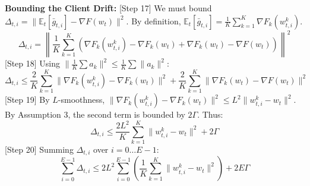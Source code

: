 \documentclass{article}
\begin{document}
\textbf{Bounding the Client Drift:}
[Step 17] We must bound $\Delta_{t,i} = \|\mathbb{E}_t[\bar{g}_{t,i}] - \nabla F(w_t)\|^2$. By definition, $\mathbb{E}_t[\bar{g}_{t,i}] = \frac{1}{K}\sum_{k=1}^K \nabla F_k(w_{t,i}^k)$.
$$ \Delta_{t,i} = \left\| \frac{1}{K}\sum_{k=1}^K \left( \nabla F_k(w_{t,i}^k) - \nabla F_k(w_t) + \nabla F_k(w_t) - \nabla F(w_t) \right) \right\|^2 $$
[Step 18] Using $\|\frac{1}{K}\sum a_k\|^2 \leq \frac{1}{K}\sum \|a_k\|^2$:
$$ \Delta_{t,i} \leq \frac{2}{K}\sum_{k=1}^K \|\nabla F_k(w_{t,i}^k) - \nabla F_k(w_t)\|^2 + \frac{2}{K}\sum_{k=1}^K \|\nabla F_k(w_t) - \nabla F(w_t)\|^2 $$
[Step 19] By $L$-smoothness, $\|\nabla F_k(w_{t,i}^k) - \nabla F_k(w_t)\|^2 \leq L^2 \|w_{t,i}^k - w_t\|^2$. By Assumption 3, the second term is bounded by $2\Gamma$. Thus:
$$ \Delta_{t,i} \leq \frac{2L^2}{K}\sum_{k=1}^K \|w_{t,i}^k - w_t\|^2 + 2\Gamma $$
[Step 20] Summing $\Delta_{t,i}$ over $i=0 \dots E-1$:
$$ \sum_{i=0}^{E-1} \Delta_{t,i} \leq 2L^2 \sum_{i=0}^{E-1} \left( \frac{1}{K}\sum_{k=1}^K \|w_{t,i}^k - w_t\|^2 \right) + 2E\Gamma $$
\end{document}
